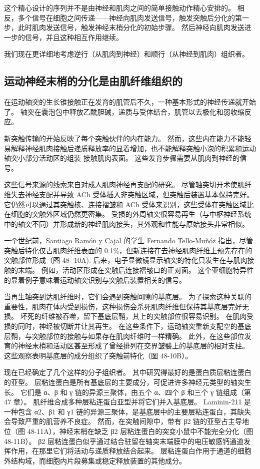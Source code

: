 这个精心设计的序列并不是由神经和肌肉之间的简单接触动作精心安排的。 相反，多个信号在细胞之间传递——神经向肌肉发送信号，触发突触后分化的第一步，此时肌肉发送信号，触发神经末梢分化的初始步骤。 然后神经向肌肉发送进一步的信号，并且这种相互作用继续。

我们现在更详细地考虑逆行（从肌肉到神经）和顺行（从神经到肌肉）组织者。

\subsection{运动神经末梢的分化是由肌纤维组织的}
在运动轴突的生长锥接触正在发育的肌管后不久，一种基本形式的神经传递就开始了。 轴突在囊泡包中释放乙酰胆碱，递质与受体结合，肌管以去极化和弱收缩反应。

新突触传输的开始反映了每个突触伙伴的内在能力。 然而，这些内在能力不能轻易解释神经肌肉接触后递质释放率的显着增加，也不能解释突触小泡的积累和运动轴突小部分活动区的组装 接触肌肉表面。 这些发育步骤需要从肌肉到神经的信号。

这些信号来源的线索来自对成人肌肉神经再支配的研究。 尽管轴突切开术使肌纤维失去神经支配并导致 ACh 受体插入非突触区域，但突触后装置基本保持完好。 它仍然可以通过其突触核、连接褶皱和 ACh 受体来识别，这些受体在突触区域比在细胞的突触外区域仍然更密集。 受损的外周轴突很容易再生（与中枢神经系统中的轴突不同）并形成新的神经肌肉接头，其外观和性能与原始接头非常相似。

一个世纪前，Santiago Ramón y Cajal 的学生 Fernando Tello-Muñóz 指出，尽管突触后特化仅占肌肉纤维表面的 0.1\%，但新连接在去神经肌肉纤维上预先存在的突触部位形成（图 48- 10A). 后来，电子显微镜显示轴突的特化只发生在与肌肉接触的末端。 例如，活动区形成在突触后连接褶皱口的正对面。 这个亚细胞特异性的显着例子意味着运动轴突识别与突触后装置相关的信号。

当再生轴突到达肌纤维时，它们会遇到突触间隙的基底层。 为了探索这种关联的重要性，肌肉在体内受到损伤，这种损伤会杀死肌肉纤维但保持其基底层完好无损。 坏死的纤维被吞噬，留下基底层鞘，其上的突触部位很容易识别。 在肌肉受损的同时，神经被切断并让其再生。 在这些条件下，运动轴突重新支配空的基底层鞘，与突触部位的接触与如果存在肌肉纤维时一样精确。 此外，在这些部位发育的神经末梢和活动区甚至形成了曾经排列在交界皱襞上的基底层的相对支柱。 这些观察表明基底层的成分组织了突触前特化（图 48-10B）。

现在已经确定了几个这样的分子组织者。 其中研究得最好的是蛋白质层粘连蛋白的亚型。 层粘连蛋白是所有基底层的主要成分，可促进许多神经元类型的轴突生长。 它们是 α、β 和 γ 链的异源三聚体，由五个 α、四个 β 和三个 γ 链组成（第 47 章）。 肌纤维合成多种层粘连蛋白亚型并将它们并入基底层。 Laminin-211 是一种包含 α2、β1 和 γ1 链的异源三聚体，是基底层中的主要层粘连蛋白，其缺失会导致严重的肌营养不良症。 然而，在突触间隙中，带有 β2 链的亚型占主导地位（图 48-11A），神经末梢在缺乏 β2 层粘连蛋白的突变小鼠中不能完全分化（图 48-11B）。 β2 层粘连蛋白似乎通过结合驻留在轴突末端膜中的电压敏感钙通道发挥作用，在那里它们将活动与递质释放结合起来。 层粘连蛋白作用于通道的细胞外结构域，而细胞内片段募集或稳定释放装置的其他成分。

